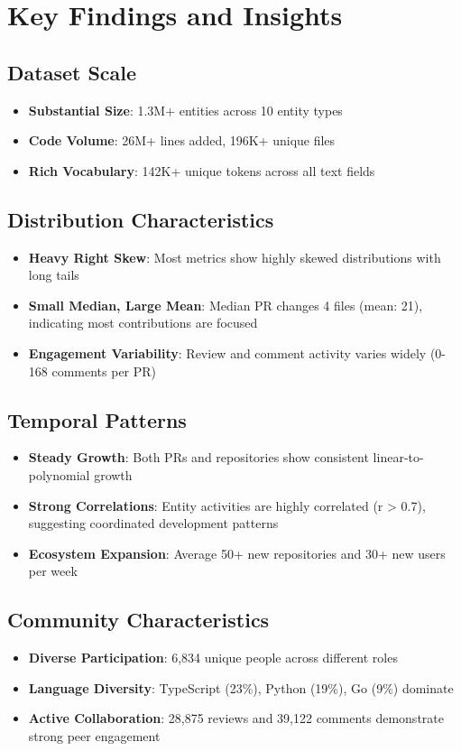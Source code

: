 \documentclass[11pt]{article}
\begin{document}
\section{Key Findings and Insights}

\subsection{Dataset Scale}
\begin{itemize}
    \item \textbf{Substantial Size}: 1.3M+ entities across 10 entity types
    \item \textbf{Code Volume}: 26M+ lines added, 196K+ unique files
    \item \textbf{Rich Vocabulary}: 142K+ unique tokens across all text fields
\end{itemize}

\subsection{Distribution Characteristics}
\begin{itemize}
    \item \textbf{Heavy Right Skew}: Most metrics show highly skewed distributions with long tails
    \item \textbf{Small Median, Large Mean}: Median PR changes 4 files (mean: 21), indicating most contributions are focused
    \item \textbf{Engagement Variability}: Review and comment activity varies widely (0-168 comments per PR)
\end{itemize}

\subsection{Temporal Patterns}
\begin{itemize}
    \item \textbf{Steady Growth}: Both PRs and repositories show consistent linear-to-polynomial growth
    \item \textbf{Strong Correlations}: Entity activities are highly correlated (r > 0.7), suggesting coordinated development patterns
    \item \textbf{Ecosystem Expansion}: Average 50+ new repositories and 30+ new users per week
\end{itemize}

\subsection{Community Characteristics}
\begin{itemize}
    \item \textbf{Diverse Participation}: 6,834 unique people across different roles
    \item \textbf{Language Diversity}: TypeScript (23\%), Python (19\%), Go (9\%) dominate
    \item \textbf{Active Collaboration}: 28,875 reviews and 39,122 comments demonstrate strong peer engagement
\end{itemize}
\end{document}
